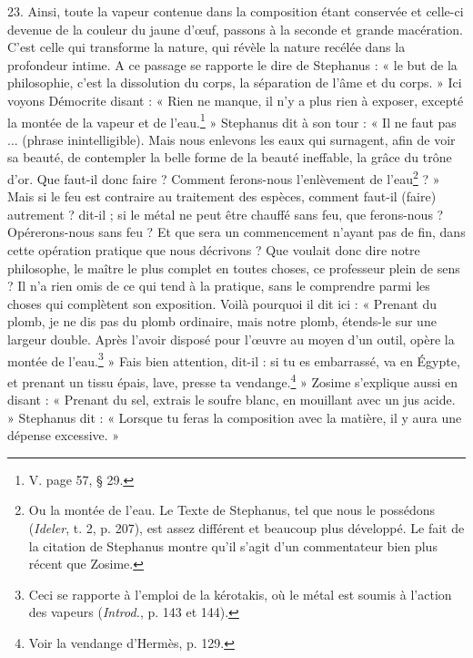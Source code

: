 \documentclass[a4paper, 11pt, oneside, polutonikogreek, french]{article}
\begin{document}
23. Ainsi, toute la vapeur contenue dans la composition étant conservée et celle-ci devenue de la couleur du jaune d'œuf, passons à la seconde et grande macération. C'est celle qui transforme la nature, qui révèle la nature recélée dans la profondeur intime. A ce passage se rapporte le dire de Stephanus : « le but de la philosophie, c'est la dissolution du corps, la séparation de l'âme et du corps. » Ici voyons Démocrite disant : « Rien ne manque, il n'y a plus rien à exposer, excepté la montée de la vapeur et de l'eau.\footnote{V. page 57, § 29.} » Stephanus dit à son tour : « Il ne faut pas ... (phrase inintelligible). Mais nous enlevons les eaux qui surnagent, afin de voir sa beauté, de contempler la belle forme de la beauté ineffable, la grâce du trône d'or. Que faut-il donc faire ? Comment ferons-nous l'enlèvement de l'eau\footnote{Ou la montée de l'eau. Le Texte de Stephanus, tel que nous le possédons (\emph{Ideler}, t. 2, p. 207), est assez différent et beaucoup plus développé. Le fait de la citation de Stephanus montre qu'il s'agit d'un commentateur bien plus récent que Zosime.} ? » Mais si le feu est contraire au traitement des espèces, comment faut-il (faire) autrement ? dit-il ; si le métal ne peut être chauffé sans feu, que ferons-nous ? Opérerons-nous sans feu ? Et que sera un commencement n'ayant pas de fin, dans cette opération pratique que nous décrivons ? Que voulait donc dire notre philosophe, le maître le plus complet en toutes choses, ce professeur plein de sens ? Il n'a rien omis de ce qui tend à la pratique, sans le comprendre parmi les choses qui complètent son exposition. Voilà pourquoi il dit ici : « Prenant du plomb, je ne dis pas du plomb ordinaire, mais notre plomb, étends-le sur une largeur double. Après l'avoir disposé pour l'œuvre au moyen d'un outil, opère la montée de l'eau.\footnote{Ceci se rapporte à l'emploi de la kérotakis, où le métal est soumis à l'action des vapeurs (\emph{Introd.}, p. 143 et 144).} » Fais bien attention, dit-il : si tu es embarrassé, va en Égypte, et prenant un tissu épais, lave, presse ta vendange.\footnote{Voir la vendange d'Hermès, p. 129.} » Zosime s'explique aussi en disant : « Prenant du sel, extrais le soufre blanc, en mouillant avec un jus acide. » Stephanus dit : « Lorsque tu feras la composition avec la matière, il y aura une dépense excessive. »
\end{document}

